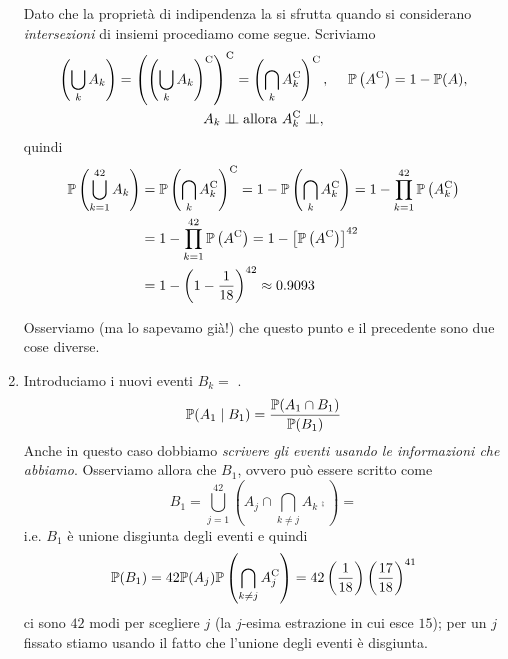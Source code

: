 \begin{enumerate}
	Dato che la proprietà di indipendenza la si sfrutta quando si considerano \textit{intersezioni} di insiemi procediamo come segue. Scriviamo
	\begin{gather*}
		\left(\bigcup_{k} A_{k}\right) =\left(\left(\bigcup_{k} A_{k}\right)^{\mathrm{C}}\right)^{\mathrm{C}} =\left(\bigcap_{k} A_{k}^{\mathrm{C}}\right)^{\mathrm{C}} ,\ \ \ \ \mathbb{P}\left(A^{\mathrm{C}}\right) =1-\mathbb{P}(A) ,\\
		A_{k} \perp \!\!\! \perp \text{allora} \ A_{k}^{\mathrm{C}} \perp \!\!\! \perp ,
	\end{gather*}
	quindi
	\begin{align*}
		\mathbb{P}\left(\bigcup_{k=1}^{42} A_{k}\right) & =\mathbb{P}\left(\bigcap_{k} A_{k}^{\mathrm{C}}\right)^{\mathrm{C}} =1-\mathbb{P}\left(\bigcap_{k} A_{k}^{\mathrm{C}}\right) =1-\prod_{k=1}^{42}\mathbb{P}\left(A_{k}^{\mathrm{C}}\right)\\
		 & =1-\prod_{k=1}^{42}\mathbb{P}\left(A^{\mathrm{C}}\right) =1-\left[\mathbb{P}\left(A^{\mathrm{C}}\right)\right]^{42}\\
		 & =1-\left(1-\frac{1}{18}\right)^{42} \approx 0.9093
	\end{align*}

	\begin{oss}
		Osserviamo (ma lo sapevamo già!) che questo punto e il precedente sono due cose diverse.
	\end{oss}
	\item Introduciamo i nuovi eventi $B_{k} =$ .
	\begin{equation*}
		\mathbb{P}(A_{1} \mid B_{1}) =\frac{\mathbb{P}(A_{1} \cap B_{1})}{\mathbb{P}(B_{1})}
	\end{equation*}
	Anche in questo caso dobbiamo \textit{scrivere gli eventi usando le informazioni che abbiamo}. Osserviamo allora che $B_{1}$, ovvero  può essere scritto come
	\begin{equation*}
		B_{1} =\bigcup_{j=1}^{42}\left(A_{j} \cap \bigcap_{k\neq j} A_{k}\comp\right) =
	\end{equation*}
	i.e. $B_{1}$ è unione disgiunta degli eventi  e quindi
	\begin{equation*}
		\mathbb{P}(B_{1}) =42\mathbb{P}(A_{j})\mathbb{P}\left(\bigcap_{k\neq j} A_{j}^{\mathrm{C}}\right) =42\left(\frac{1}{18}\right)\left(\frac{17}{18}\right)^{41}
	\end{equation*}
	ci sono $42$ modi per scegliere $j$ (la $j$-esima estrazione in cui esce $15$); per un $j$ fissato stiamo usando il fatto che l'unione degli eventi è disgiunta.


\end{enumerate}
